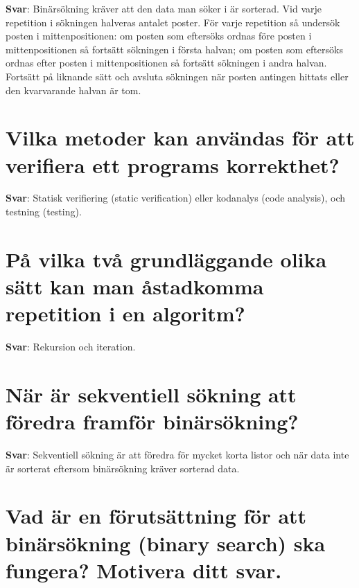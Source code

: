 \documentclass[a4paper,11pt,oneside]{book}
\begin{document}
\begin{sloppypar}
\label{q:180:sa:sv:True}

\textbf{Svar}: Bin\"ars\"okning kr\"aver att den data man s\"oker i \"ar sorterad. Vid varje repetition i s\"okningen halveras antalet poster. F\"or varje repetition s\r{a} unders\"ok posten i mittenpositionen: om posten som efters\"oks ordnas f\"ore posten i mittenpositionen s\r{a} forts\"att s\"okningen i f\"orsta halvan; om posten som efters\"oks ordnas efter posten i mittenpositionen s\r{a} forts\"att s\"okningen i andra halvan. Forts\"att p\r{a} liknande s\"att och avsluta s\"okningen n\"ar posten antingen hittats eller den kvarvarande halvan \"ar tom.



\section{Vilka metoder kan anv\"andas f\"or att verifiera ett programs korrekthet?}

\label{q:181:sa:sv:True}

\textbf{Svar}: Statisk verifiering (static verification) eller kodanalys (code analysis), och testning (testing).



\section{P\r{a} vilka tv\r{a} grundl\"aggande olika s\"att kan man \r{a}stadkomma repetition i en algoritm?}

\label{q:182:sa:sv:True}

\textbf{Svar}: Rekursion och iteration.



\section{N\"ar \"ar sekventiell s\"okning att f\"oredra framf\"or bin\"ars\"okning?}

\label{q:183:sa:sv:True}

\textbf{Svar}: Sekventiell s\"okning \"ar att f\"oredra f\"or mycket korta listor och n\"ar data inte \"ar sorterat eftersom bin\"ars\"okning kr\"aver sorterad data.



\section{Vad \"ar en f\"oruts\"attning f\"or att bin\"ars\"okning (binary search) ska fungera? Motivera ditt svar.}


\end{sloppypar}
\end{document}
